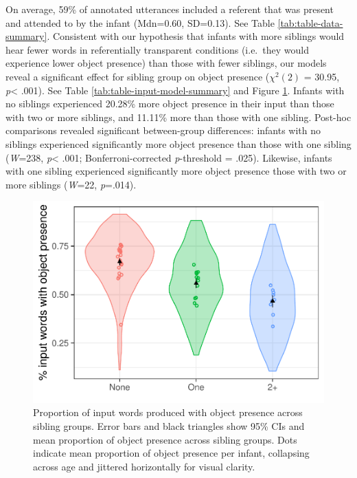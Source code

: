 \documentclass[
  english,
  man,floatsintext]{apa6}
\begin{document}
On average, 59\% of annotated utterances included a referent that was present and attended to by the infant (Mdn=0.60, SD=0.13). See Table \ref{tab:table-data-summary}. Consistent with our hypothesis that infants with more siblings would hear fewer words in referentially transparent conditions (i.e.~they would experience lower object presence) than those with fewer siblings, our models reveal a significant effect for sibling group on object presence (\(\chi^2 (2)\) = 30.95, \emph{p}\textless{} .001). See Table \ref{tab:table-input-model-summary} and Figure \ref{fig:Figure-object-presence}. Infants with no siblings experienced 20.28\% more object presence in their input than those with two or more siblings, and 11.11\% more than those with one sibling. Post-hoc comparisons revealed significant between-group differences: infants with no siblings experienced significantly more object presence than those with one sibling (\emph{W}=238, \emph{p}\textless{} .001; Bonferroni-corrected \emph{p}-threshold = .025). Likewise, infants with one sibling experienced significantly more object presence those with two or more siblings (\emph{W}=22, \emph{p}=.014).

\begin{figure}
\centering
\includegraphics{SiblingsStudyText_files/figure-latex/Figure-object-presence-1.pdf}
\caption{\label{fig:Figure-object-presence}Proportion of input words produced with object presence across sibling groups. Error bars and black triangles show 95\% CIs and mean proportion of object presence across sibling groups. Dots indicate mean proportion of object presence per infant, collapsing across age and jittered horizontally for visual clarity.}
\end{figure}
\end{document}
